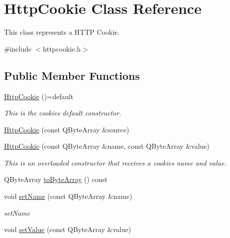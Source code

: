 \hypertarget{class_http_cookie}{}\section{Http\+Cookie Class Reference}
\label{class_http_cookie}


This class represents a H\+T\+TP Cookie.  




{\ttfamily \#include $<$httpcookie.\+h$>$}

\subsection*{Public Member Functions}
\begin{DoxyCompactItemize}
\item 
\mbox{\label{class_http_cookie_a728bef99b74d352b1762cc98e67cc93c}} 
\mbox{\hyperlink{class_http_cookie_a728bef99b74d352b1762cc98e67cc93c}{Http\+Cookie}} ()=default
\begin{DoxyCompactList}\small\item\em This is the cookie\textquotesingle{}s default constructor. \end{DoxyCompactList}\item 
\mbox{\hyperlink{class_http_cookie_aeb0f2cb5f7e8ef2fc7503663e29941c4}{Http\+Cookie}} (const Q\+Byte\+Array \&source)
\item 
\mbox{\hyperlink{class_http_cookie_a2037d1e3f9a6f65f0f3575df1cfcc200}{Http\+Cookie}} (const Q\+Byte\+Array \&name, const Q\+Byte\+Array \&value)
\begin{DoxyCompactList}\small\item\em This is an overloaded constructor that receives a cookie\textquotesingle{}s name and value. \end{DoxyCompactList}\item 
Q\+Byte\+Array \mbox{\hyperlink{class_http_cookie_aef937847dbebf7290e94b94afbb8f9a1}{to\+Byte\+Array}} () const
\item 
void \mbox{\hyperlink{class_http_cookie_a18dc03fc2cc3901051f7aec516c964b8}{set\+Name}} (const Q\+Byte\+Array \&name)
\begin{DoxyCompactList}\small\item\em set\+Name \end{DoxyCompactList}\item 
void \mbox{\hyperlink{class_http_cookie_a2f38c00473e7628a708eae2dd0cd51f0}{set\+Value}} (const Q\+Byte\+Array \&value)

\end{DoxyCompactItemize}
